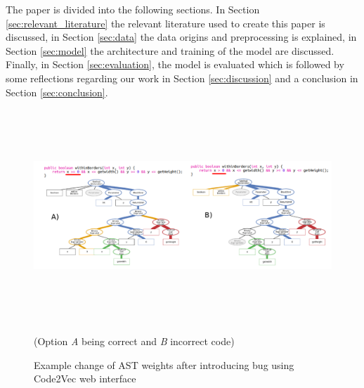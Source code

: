 The paper is divided into the following sections. In Section \ref{sec:relevant_literature} the relevant literature used to create this paper is discussed, in Section \ref{sec:data} the data origins and preprocessing is explained, in Section \ref{sec:model} the architecture and training of the model are discussed. Finally, in Section \ref{sec:evaluation}, the model is evaluated which is followed by some reflections regarding our work in Section \ref{sec:discussion} and a conclusion in Section \ref{sec:conclusion}.

\begin{figure} 
  \includegraphics[width=\textwidth,height=8cm]{figures/AST_example.png}
  \caption[]{Example change of AST weights after introducing bug using Code2Vec web interface\protect\footnotemark} (Option \textit{A} being correct and \textit{B} incorrect code)
  \label{fig:AST_exclamation}
\end{figure}

